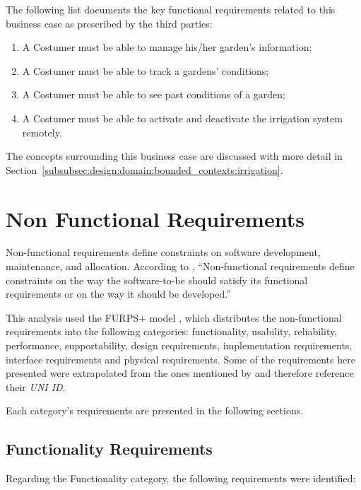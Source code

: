 The following list documents the key functional requirements related to this business case as prescribed by the third parties:

\begin{enumerate}
    \item A Costumer must be able to manage his/her garden's information;
    \item A Costumer must be able to track a gardens' conditions;
    \item A Costumer must be able to see past conditions of a garden;
    \item A Costumer must be able to activate and deactivate the irrigation system remotely.
\end{enumerate}

The concepts surrounding this business case are discussed with more detail in Section~\ref{subsubsec:design:domain:bounded_contexts:irrigation}.

\section{Non Functional Requirements}
\label{sec:requirements:non_functional}

Non-functional requirements define constraints on software development, maintenance, and allocation.
According to \cite{van2009requirements}, “Non-functional requirements define constraints on the way the software-to-be should satisfy its functional requirements or on the way it should be developed.”

This analysis used the FURPS+ model \parencite{eeles2005capturing}, which distributes the non-functional requirements into the following categories: functionality, usability, reliability, performance, supportability, design requirements, implementation requirements, interface requirements and physical requirements. Some of the requirements here presented were extrapolated from the ones mentioned by \cite{iot-a} and therefore reference their \textit{UNI ID}.

Each category's requirements are presented in the following sections.

\subsection{Functionality Requirements}
\label{subsec:requirements:non_functional:functionality}

Regarding the Functionality category, the following requirements were identified:

